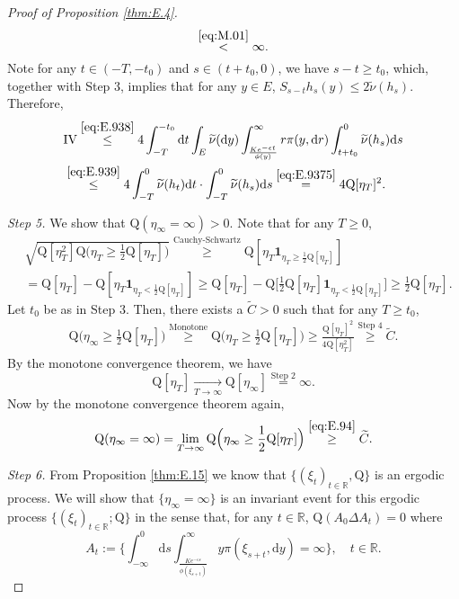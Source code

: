 \documentclass[12pt,a4paper]{amsart}
\numberwithin{equation}{section}
\theoremstyle{plain}
\theoremstyle{definition}
\theoremstyle{remark}
\begin{document}
\begin{proof}[Proof of Proposition \ref{thm:E.4}]
\begin{equation}
	\overset{\eqref{eq:M.01}}<\infty.
\end{equation}
	Note for any $t\in (-T,-t_0)$ and $s\in (t+t_0,0)$, we have $s-t\geq t_0$, 
	which, together with Step 3, 
	implies that for any $y\in E$, $S_{s-t}h_s(y) \leq 2 \widetilde\nu(h_s)$.
	Therefore,
\begin{align}
	&\text{IV}
	\overset{\eqref{eq:E.938}}\leq 4 \int_{-T}^{-t_0}\mathrm dt\int_E\widetilde \nu(\mathrm dy)\int_{\frac{Ke^{-\epsilon t}}{\phi(y)}}^\infty r \pi(y, \mathrm dr) \int_{t+t_0}^0 \widetilde \nu(h_s) \mathrm ds
	\\ &\overset{\eqref{eq:E.939}}\leq 4 \int_{-T}^0 \widetilde \nu(h_t)\mathrm dt \cdot \int_{-T}^0 \widetilde \nu(h_s)\mathrm ds
	\overset{\eqref{eq:E.9375}}= 4\mathrm Q[\eta_T]^2.
\end{align}

\emph{Step 5.}
	We show that $\mathrm Q(\eta_{\infty}=\infty) >0$.
	Note that for any $T\geq 0$,
\begin{align}
	&\sqrt{\mathrm Q[\eta_T^2] \mathrm Q\Big(\eta_T \geq \frac{1}{2}\mathrm Q[\eta_T]\Big)}
	\overset{\text{Cauchy-Schwartz}}\geq \mathrm Q[\eta_T\mathbf 1_{\eta_T\geq \frac{1}{2}\mathrm Q[\eta_T]}]
	\\&= \mathrm Q[\eta_T] - \mathrm Q[\eta_T\mathbf 1_{\eta_T< \frac{1}{2}\mathrm Q[\eta_T]} ]
	\geq \mathrm Q[\eta_T] - \mathrm Q\Big[\frac{1}{2}\mathrm Q[\eta_T]\mathbf 1_{\eta_T< \frac{1}{2}\mathrm Q[\eta_T]}\Big]
	\geq \frac{1}{2}\mathrm Q[\eta_T].
\end{align}
	Let $t_0$ be as in Step 3.
	Then, there exists a $\widetilde C>0$ such that for any $T\geq t_0$,
\begin{align}\label{eq:E.94}
	\mathrm Q\Big(\eta_\infty \geq \frac{1}{2}\mathrm Q[\eta_T]\Big)
	\overset{\text{Monotone}}\geq \mathrm Q\Big(\eta_T \geq \frac{1}{2}\mathrm Q[\eta_T]\Big)
	\geq \frac{\mathrm Q[\eta_T]^2}{4\mathrm Q[\eta_T^2]}
	\overset{\text{Step 4}}\geq \widetilde C.
\end{align}
	By the monotone convergence theorem, we have
\[
	\mathrm Q[\eta_T]
	\xrightarrow[T\to \infty]{} \mathrm Q[\eta_\infty]
	\overset{\text{Step 2}}= \infty.
\]
	Now by the monotone convergence theorem again,
\begin{align}
	\mathrm Q(\eta_\infty =\infty)
	= \lim_{T\to \infty} \mathrm Q\Big(\eta_\infty \geq \frac{1}{2}\mathrm Q[\eta_T]\Big)
	\overset{\eqref{eq:E.94}}\geq \widetilde C.
\end{align}
	
\emph{Step 6.}
	From Proposition \ref{thm:E.15} we know that $\{(\xi_t)_{t\in \mathbb R}, \mathrm Q\}$ is an ergodic process.
	We will show that $\{\eta_\infty = \infty\}$ is an invariant event for this ergodic process $\{(\xi_t)_{t\in \mathbb R}; \mathrm Q\}$ in the sense that, for any $t \in \mathbb R$, $\mathrm Q(A_{0} \Delta A_{t}) = 0$ where
\[
	A_{t}
	:= \Big\{\int_{-\infty}^{0} \mathrm ds \int_{\frac{Ke^{-\epsilon s}}{\phi(\xi_{s+t})}}^\infty y\pi(\xi_{s+t},\mathrm dy) = \infty\Big\}, \quad t\in \mathbb R.
\]
	

\end{proof}
\end{document}
